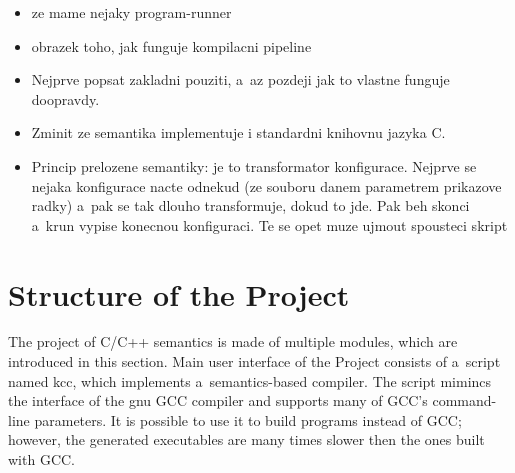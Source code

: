\documentclass[nolot,nolof,nocover,printed]{fithesis3}
\begin{document}




\begin{itemize}
\item ze mame nejaky program-runner
\item obrazek toho, jak funguje kompilacni pipeline
\item Nejprve popsat zakladni pouziti, a~az pozdeji jak to vlastne funguje doopravdy.
\item Zminit ze semantika implementuje i standardni knihovnu jazyka C.
\item Princip prelozene semantiky: je to transformator konfigurace. Nejprve se nejaka konfigurace nacte odnekud (ze souboru danem parametrem prikazove radky) a~pak se tak dlouho transformuje, dokud to jde. Pak beh skonci a~krun vypise konecnou konfiguraci. Te se opet muze ujmout spousteci skript 
\end{itemize}

\section{Structure of the Project}



The project of C/C++ semantics is made of multiple modules, which are introduced in this section. 
Main user interface of the Project consists of a~script named kcc, which implements a~semantics-based compiler. The script mimincs the interface of the gnu GCC compiler and supports many of GCC's command-line parameters. It is possible to use it to build programs instead of GCC; however, the generated executables are many times slower then the ones built with GCC.
\end{document}
